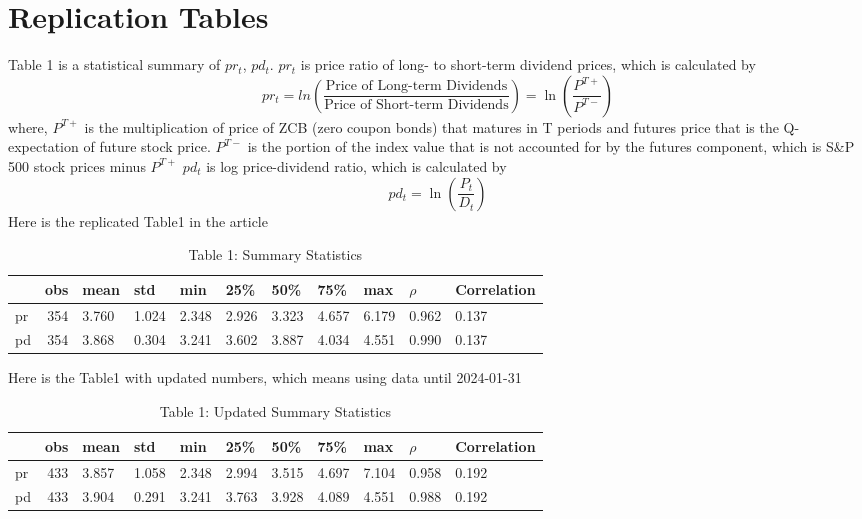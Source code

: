 \documentclass{article}
\begin{document}
\section{Replication Tables}
Table 1 is a statistical summary of \( pr_t \), \( pd_t \). \( pr_t \) 
is price ratio of long- to short-term dividend prices, which is calculated by 
\begin{equation}
pr_t = ln \left( \frac{\text{Price of Long-term Dividends}}{\text{Price of Short-term Dividends}} \right) = \ln \left( \frac{P^{T+}}{P^{T-}} \right)
\end{equation}
where, \(P^{T+}\) is the multiplication of price of ZCB (zero coupon bonds) 
that matures in T periods and futures price that is the Q-expectation of 
future stock price. \(P^{T-}\) is the portion of the index value that is not 
accounted for by the futures component, which is S\&P 500 stock prices minus \(P^{T+}\)
\newline
\newline
\( pd_t \) is log price-dividend ratio, which is calculated by 
\begin{equation}
pd_t = \ln \left(\frac{P_t}{D_t} \right)
\end{equation}
Here is the replicated Table1 in the article
\begin{table}[H]
\centering
\begin{tabular}{lrlllllllll}
    \toprule
    & obs & mean & std & min & 25\% & 50\% & 75\% & max & $\rho$ & Correlation \\
    \midrule
    pr & 354 & 3.760 & 1.024 & 2.348 & 2.926 & 3.323 & 4.657 & 6.179 & 0.962 & 0.137 \\
    pd & 354 & 3.868 & 0.304 & 3.241 & 3.602 & 3.887 & 4.034 & 4.551 & 0.990 & 0.137 \\
    \bottomrule
\end{tabular}
\caption*{Table 1: Summary Statistics}
\label{tab:your_label}
\end{table}

Here is the Table1 with updated numbers, which means using data until 2024-01-31
\begin{table}[H]
\centering
\begin{tabular}{lrlllllllll}
    \toprule
     & obs & mean & std & min & 25\% & 50\% & 75\% & max & $\rho$ & Correlation \\
    \midrule
    pr & 433 & 3.857 & 1.058 & 2.348 & 2.994 & 3.515 & 4.697 & 7.104 & 0.958 & 0.192 \\
    pd & 433 & 3.904 & 0.291 & 3.241 & 3.763 & 3.928 & 4.089 & 4.551 & 0.988 & 0.192 \\
    \bottomrule
\end{tabular}
\caption*{Table 1: Updated Summary Statistics}
\label{tab:your_label}
\end{table}
\end{document}

